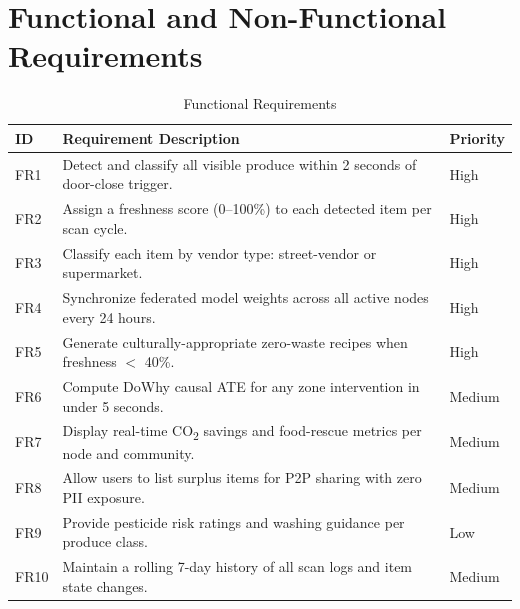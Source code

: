 \documentclass[12pt,a4paper]{report}
\begin{document}
\section{Functional and Non-Functional Requirements}

\begin{table}[ht]
\centering
\caption{Functional Requirements}
\label{tab:fr}
\begin{tabularx}{\textwidth}{C{0.08\textwidth} L{0.60\textwidth} C{0.25\textwidth}}
\toprule
\textbf{ID} & \textbf{Requirement Description} & \textbf{Priority} \\
\midrule
FR1 & Detect and classify all visible produce within 2 seconds of door-close trigger. & High \\
FR2 & Assign a freshness score (0--100\%) to each detected item per scan cycle. & High \\
FR3 & Classify each item by vendor type: street-vendor or supermarket. & High \\
FR4 & Synchronize federated model weights across all active nodes every 24 hours. & High \\
FR5 & Generate culturally-appropriate zero-waste recipes when freshness $<$ 40\%. & High \\
FR6 & Compute DoWhy causal ATE for any zone intervention in under 5 seconds. & Medium \\
FR7 & Display real-time CO\textsubscript{2} savings and food-rescue metrics per node and community. & Medium \\
FR8 & Allow users to list surplus items for P2P sharing with zero PII exposure. & Medium \\
FR9 & Provide pesticide risk ratings and washing guidance per produce class. & Low \\
FR10 & Maintain a rolling 7-day history of all scan logs and item state changes. & Medium \\
\bottomrule
\end{tabularx}
\end{table}
\end{document}

